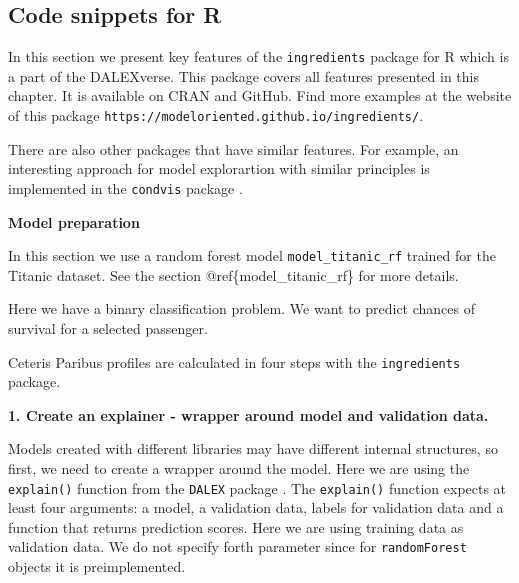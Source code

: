\documentclass[]{krantz}
\newenvironment{Shaded}{\begin{snugshade}}{\end{snugshade}}
\newcommand{\DataTypeTok}[1]{\textcolor[rgb]{0.13,0.29,0.53}{#1}}
\newcommand{\KeywordTok}[1]{\textcolor[rgb]{0.13,0.29,0.53}{\textbf{#1}}}
\newcommand{\NormalTok}[1]{#1}
\newcommand{\OperatorTok}[1]{\textcolor[rgb]{0.81,0.36,0.00}{\textbf{#1}}}
\newcommand{\StringTok}[1]{\textcolor[rgb]{0.31,0.60,0.02}{#1}}
\theoremstyle{definition}
\theoremstyle{definition}
\theoremstyle{definition}
\theoremstyle{remark}
\begin{document}
\hypertarget{code-snippets-for-r}{%
\subsection{Code snippets for R}\label{code-snippets-for-r}}

In this section we present key features of the \texttt{ingredients}
package for R \citep{R-ingredients} which is a part of the DALEXverse.
This package covers all features presented in this chapter. It is
available on CRAN and GitHub. Find more examples at the website of this
package \texttt{https://modeloriented.github.io/ingredients/}.

There are also other packages that have similar features. For example,
an interesting approach for model explorartion with similar principles
is implemented in the \texttt{condvis} package \citep{JSSv081i05}.

\textbf{Model preparation}

In this section we use a random forest \citep{R-randomForest} model
\texttt{model\_titanic\_rf} trained for the Titanic dataset. See the
section @ref\{model\_titanic\_rf\} for more details.

Here we have a binary classification problem. We want to predict chances
of survival for a selected passenger.

Ceteris Paribus profiles are calculated in four steps with the
\texttt{ingredients} package.

\textbf{1. Create an explainer - wrapper around model and validation
data.}

Models created with different libraries may have different internal
structures, so first, we need to create a wrapper around the model. Here
we are using the \texttt{explain()} function from the \texttt{DALEX}
package \citep{R-DALEX}. The \texttt{explain()} function expects at
least four arguments: a model, a validation data, labels for validation
data and a function that returns prediction scores. Here we are using
training data as validation data. We do not specify forth parameter
since for \texttt{randomForest} objects it is preimplemented.

\begin{Shaded}
\end{Shaded}
\end{document}
